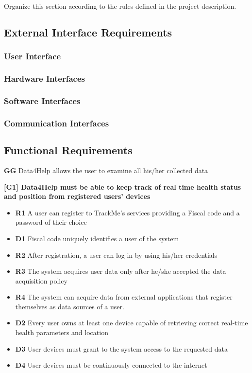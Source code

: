 Organize this section according to the rules defined in the project description. 
\subsection{External Interface Requirements}
\subsubsection{User Interface}
\subsubsection{Hardware Interfaces}
\subsubsection{Software Interfaces}
\subsubsection{Communication Interfaces}
\subsection{Functional Requirements}
\textbf{GG} Data4Help allows the user to examine all his/her collected data

\textbf{[G1] Data4Help must be able to keep track of real time health status and position from registered users' devices}
\begin{itemize}
\item \textbf{R1} A user can register to TrackMe's services providing a Fiscal code and a password of their choice
\item \textbf{D1} Fiscal code uniquely identifies a user of the system
\item \textbf{R2} After registration, a user can log in by using his/her credentials
\item \textbf{R3} The system acquires user data only after he/she accepted the data acquisition policy
\item \textbf{R4} The system can acquire data from external applications that register themselves as data sources of a user.
\item \textbf{D2} Every user owns at least one device capable of retrieving correct real-time health parameters and location
\item \textbf{D3} User devices must grant to the system access to the requested data
\item \textbf{D4} User devices must be continuously connected to the internet
\end{itemize}

